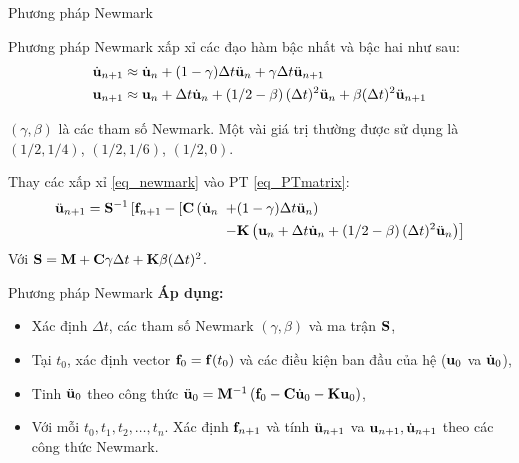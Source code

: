 \documentclass[aspectratio=169, t]{beamer} %
\begin{document}
\begin{frame}{Phương pháp Newmark}

Phương pháp Newmark xấp xỉ các đạo hàm bậc nhất và bậc hai như sau:
\begin{equation}\label{eq_newmark}
    \begin{aligned}
    \dot{\bf u}_{n+1} &\approx \dot{\bf u}_n+(1-\gamma) \Delta t \ddot{\bf u}_n+\gamma \Delta t \ddot{\bf u}_{n+1}\\
    {\bf u}_{n+1} &\approx {\bf u}_n+\Delta t \dot{\bf u}_n+\left(1/2-\beta\right)(\Delta t)^2 \ddot{\bf u}_n+\beta(\Delta t)^2 \ddot{\bf u}_{n+1}
\end{aligned}
\end{equation}

$(\gamma, \beta)$ là các tham số Newmark. Một vài giá trị thường được sử dụng là $(1/2, 1/4)$, $(1/2, 1/6)$, $(1/2, 0)$.

Thay các xấp xỉ \ref{eq_newmark} vào PT \ref{eq_PTmatrix}:
\begin{equation}
\begin{aligned}
    \ddot{\bf u}_{n+1}={\bf S}^{-1}\left[{\bf f}_{n+1}-[{\bf C}\left(\dot{\bf u}_n\right.\right. & \left.+(1-\gamma) \Delta t \ddot{\bf u}_n\right) \\
& \left.-{\bf K}\left({\bf u}_n+\Delta t \dot{\bf u}_n+\left(1/2-\beta\right)(\Delta t)^2 \ddot{\bf u}_n\right)\right]
\end{aligned}
\end{equation}
Với ${\bf S} = {\bf M} + {\bf C}\gamma\Delta t + {\bf K}\beta(\Delta t)^2$.
    
\end{frame}

\begin{frame}{Phương pháp Newmark}
\vspace{15mm}
\textbf{Áp dụng:}
\begin{itemize}
    \item Xác định $\Delta t$, các tham số Newmark $(\gamma,\beta)$ và ma trận ${\bf S}$,
    \item Tại $t_0$, xác định vector ${\bf f}_0 = {\bf f}(t_0)$ và các điều kiện ban đầu của hệ (${\bf u}_0$ va $\dot{\bf u}_0$),
    \item Tinh $\ddot{\bf u}_0$ theo công thức $\ddot{\bf u}_0 = {\bf M}^{-1}\left({\bf f}_0 - {\bf C}\dot{\bf u}_0 - {\bf K}{\bf u}_0\right)$,
    \item Với mỗi $t_0, t_1, t_2, \dots,t_n$. Xác định ${\bf f}_{n+1}$ và tính $\ddot{\bf u}_{n+1}$ va ${\bf u}_{n+1}, \dot{\bf u}_{n+1}$ theo các công thức Newmark.
\end{itemize}
    
\end{frame}
\end{document}
